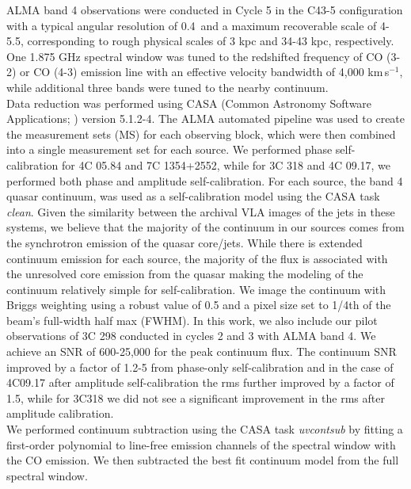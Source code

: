 \documentclass[twocolumn]{aastex63}
\newcommand{\kms}{km\,s$^{-1}$}
\begin{document}
ALMA band 4 observations were conducted in Cycle 5 in the C43-5 configuration with a typical angular resolution of 0.4\arcsec\ and a maximum recoverable scale of 4-5.5\arcsec, corresponding to rough physical scales of 3 kpc and 34-43 kpc, respectively. One 1.875 GHz spectral window was tuned to the redshifted frequency of CO (3-2) or CO (4-3) emission line with an effective velocity bandwidth of 4,000 \kms, while additional three bands were tuned to the nearby continuum.\\  

Data reduction was performed using CASA (Common Astronomy Software Applications; \citealt{McMullin07}) version 5.1.2-4. The ALMA automated pipeline was used to create the measurement sets (MS) for each observing block, which were then combined into a single measurement set for each source. We performed phase self-calibration for 4C 05.84 and 7C 1354+2552, while for 3C 318 and 4C 09.17, we performed both phase and amplitude self-calibration. For each source, the band 4 quasar continuum, was used as a self-calibration model using the CASA task \textit{clean}. Given the similarity between the archival VLA images of the jets in these systems, we believe that the majority of the continuum in our sources comes from the synchrotron emission of the quasar core/jets. While there is extended continuum emission for each source, the majority of the flux is associated with the unresolved core emission from the quasar making the modeling of the continuum relatively simple for self-calibration. We image the continuum with Briggs weighting using a robust value of 0.5 and a pixel size set to 1/4th of the beam's full-width half max (FWHM). In this work, we also include our pilot observations of 3C 298 conducted in cycles 2 and 3 \citep{Vayner17} with ALMA band 4. We achieve an SNR of 600-25,000 for the peak continuum flux. The continuum SNR improved by a factor of 1.2-5 from phase-only self-calibration and in the case of 4C09.17 after amplitude self-calibration the rms further improved by a factor of 1.5, while for 3C318 we did not see a significant improvement in the rms after amplitude calibration.\\

We performed continuum subtraction using the CASA task \textit{uvcontsub} by fitting a first-order polynomial to line-free emission channels of the spectral window with the CO emission. We then subtracted the best fit continuum model from the full spectral window.\\
\end{document}

